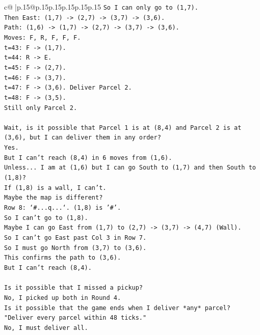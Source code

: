 \documentclass{article}
\begin{document}
{\begin{supertabular}{c@{$\;$}|p{.15\linewidth}@{}p{.15\linewidth}p{.15\linewidth}p{.15\linewidth}p{.15\linewidth}p{.15\linewidth}}
{{{\texttt{So I can only go to (1,7).} \\
\texttt{Then East: (1,7) {-}> (2,7) {-}> (3,7) {-}> (3,6).} \\
\texttt{Path: (1,6) {-}> (1,7) {-}> (2,7) {-}> (3,7) {-}> (3,6).} \\
\texttt{Moves: F, R, F, F, F.} \\
\texttt{t=43: F {-}> (1,7).} \\
\texttt{t=44: R {-}> E.} \\
\texttt{t=45: F {-}> (2,7).} \\
\texttt{t=46: F {-}> (3,7).} \\
\texttt{t=47: F {-}> (3,6). Deliver Parcel 2.} \\
\texttt{t=48: F {-}> (3,5).} \\
\texttt{Still only Parcel 2.} \\
\\ 
\texttt{Wait, is it possible that Parcel 1 is at (8,4) and Parcel 2 is at (3,6), but I can deliver them in any order?} \\
\texttt{Yes.} \\
\texttt{But I can't reach (8,4) in 6 moves from (1,6).} \\
\texttt{Unless... I am at (1,6) but I can go South to (1,7) and then South to (1,8)?} \\
\texttt{If (1,8) is a wall, I can't.} \\
\texttt{Maybe the map is different?} \\
\texttt{Row 8: `\#...q...`. (1,8) is '\#'.} \\
\texttt{So I can't go to (1,8).} \\
\texttt{Maybe I can go East from (1,7) to (2,7) {-}> (3,7) {-}> (4,7) (Wall).} \\
\texttt{So I can't go East past Col 3 in Row 7.} \\
\texttt{So I must go North from (3,7) to (3,6).} \\
\texttt{This confirms the path to (3,6).} \\
\texttt{But I can't reach (8,4).} \\
\\ 
\texttt{Is it possible that I missed a pickup?} \\
\texttt{No, I picked up both in Round 4.} \\
\texttt{Is it possible that the game ends when I deliver *any* parcel?} \\
\texttt{"Deliver every parcel within 48 ticks."} \\
\texttt{No, I must deliver all.} \\
}}}
\end{supertabular}}
\end{document}
